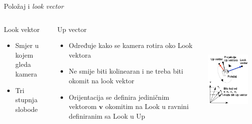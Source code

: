 \documentclass[9pt]{beamer}
\begin{document}
\begin{frame}{Položaj i \textsl{look vector}}
	\begin{columns}
		\column[t]{7cm}
		\begin{block}{Look vektor}
			\begin{itemize}
				\item Smjer u kojem gleda kamera
				\item Tri stupnja slobode
			\end{itemize}
		\end{block}
		\begin{block}{Up vector}
			\begin{itemize}
				\item Određuje kako se kamera rotira oko Look vektora
				\item Ne smije biti kolinearan i ne treba biti okomit na look vektor  
				\item Orijentacija se definira jediničnim vektorom $\mathbf{v}$ okomitim na 
				Look u ravnini definiranim sa Look u Up			
			\end{itemize}
		\end{block}
		\column[t]{5cm}
		\begin{center}
			\includegraphics[height=6cm]{slike/01_orientation2.png}
		\end{center}
	\end{columns}
\end{frame}
\end{document}
